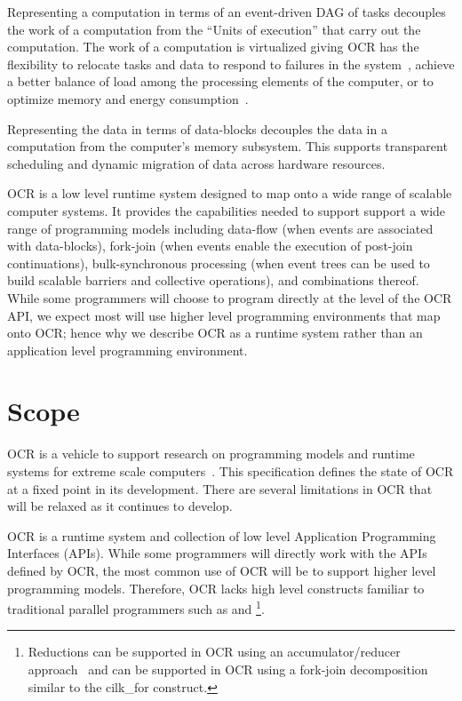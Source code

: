 Representing a computation in terms of an event-driven DAG of tasks
decouples the work of a computation
from the ``Units of execution'' that carry out the computation.  The work
of a computation is virtualized giving OCR has the flexibility to relocate tasks and data
to respond to failures in the system~\cite{Vrvilo14}, achieve a better balance of load
among the processing elements of the computer, or to optimize memory
and energy consumption~\cite{GZCS10,Guo10,CTBCCGYS13,SbBS14}.

Representing the data in terms of data-blocks
decouples the data in a computation from the computer's memory subsystem.
This supports transparent scheduling and dynamic migration of data
across hardware resources.

OCR is a low level runtime system designed to map onto a wide range of scalable
computer systems.
It provides the capabilities needed to support support a wide range of programming models
including data-flow (when events are associated with data-blocks),
fork-join (when events enable the execution of post-join
continuations), bulk-synchronous processing (when event trees can be
used to build scalable barriers and collective operations), and
combinations thereof.  While some programmers will choose to program directly
at the level of the OCR API, we expect most will use higher level
programming environments that map onto OCR; hence why we describe OCR as a
runtime system rather than an application level programming environment.


\section{Scope}
\label{sec:Scope}

OCR is a vehicle to support research on programming models and
runtime systems for extreme scale
computers~\cite{ExascaleSoftwareStudy2009,SaHS10}. This specification
defines the state of OCR at a fixed point in its development. There
are several limitations in OCR that will be relaxed as it continues to
develop.

OCR is a runtime system and collection of low level Application
Programming Interfaces (APIs). While some programmers will directly
work with the APIs defined by OCR, the most common use of OCR will be
to support higher level programming models. Therefore, OCR lacks high
level constructs familiar to traditional parallel programmers such as
 and \footnote{Reductions can be
supported in OCR using an accumulator/reducer
approach~\cite{Frigo:2009:ROC:1583991.1584017,SCZS13} and
 can be supported in OCR
using a fork-join decomposition similar to the cilk\_for construct.}.

